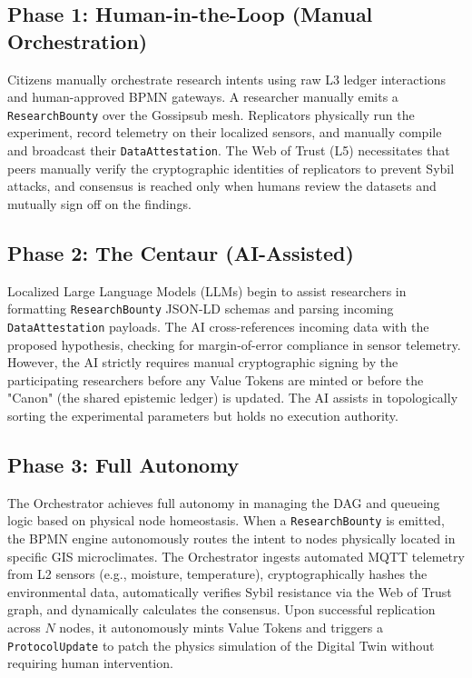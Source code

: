 \subsection{Phase 1: Human-in-the-Loop (Manual Orchestration)}
Citizens manually orchestrate research intents using raw L3 ledger interactions and human-approved BPMN gateways. A researcher manually emits a \texttt{ResearchBounty} over the Gossipsub mesh. Replicators physically run the experiment, record telemetry on their localized sensors, and manually compile and broadcast their \texttt{DataAttestation}. The Web of Trust (L5) necessitates that peers manually verify the cryptographic identities of replicators to prevent Sybil attacks, and consensus is reached only when humans review the datasets and mutually sign off on the findings. 

\subsection{Phase 2: The Centaur (AI-Assisted)}
Localized Large Language Models (LLMs) begin to assist researchers in formatting \texttt{ResearchBounty} JSON-LD schemas and parsing incoming \texttt{DataAttestation} payloads. The AI cross-references incoming data with the proposed hypothesis, checking for margin-of-error compliance in sensor telemetry. However, the AI strictly requires manual cryptographic signing by the participating researchers before any Value Tokens are minted or before the "Canon" (the shared epistemic ledger) is updated. The AI assists in topologically sorting the experimental parameters but holds no execution authority.

\subsection{Phase 3: Full Autonomy}
The Orchestrator achieves full autonomy in managing the DAG and queueing logic based on physical node homeostasis. When a \texttt{ResearchBounty} is emitted, the BPMN engine autonomously routes the intent to nodes physically located in specific GIS microclimates. The Orchestrator ingests automated MQTT telemetry from L2 sensors (e.g., moisture, temperature), cryptographically hashes the environmental data, automatically verifies Sybil resistance via the Web of Trust graph, and dynamically calculates the consensus. Upon successful replication across $N$ nodes, it autonomously mints Value Tokens and triggers a \texttt{ProtocolUpdate} to patch the physics simulation of the Digital Twin without requiring human intervention.

